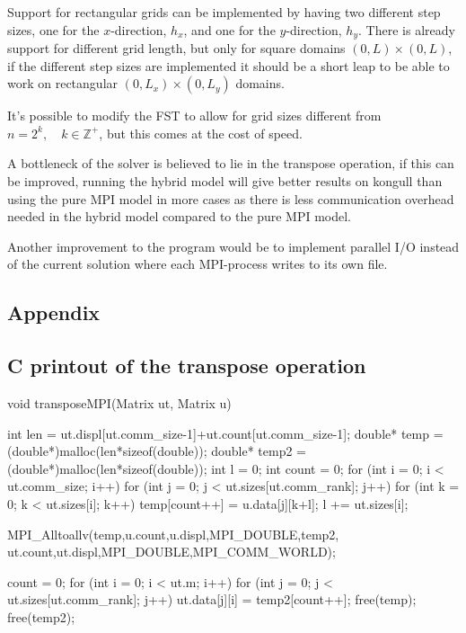 \documentclass[11pt,a4paper,english]{article}
\numberwithin{figure}{subsection}
\numberwithin{table}{subsection}
\begin{document}
Support for rectangular grids can be implemented by having two different step sizes, one for the $x$-direction, $h_x$, and one for the $y$-direction, $h_y$. There is already support for different grid length, but only for square domains $(0,L)\times(0,L)$, if the different step sizes are implemented it should be a short leap to be able to work on rectangular $(0,L_x)\times(0,L_y)$ domains.

It's possible to modify the FST to allow for grid sizes different from $n=2^k,\quad k\in\mathbb{Z}^+$, but this comes at the cost of speed.

A bottleneck of the solver is believed to lie in the transpose operation, if this can be improved, running the hybrid model will give better results on kongull than using the pure MPI model in more cases as there is less communication overhead needed in the hybrid model compared to the pure MPI model.

Another improvement to the program would be to implement parallel I/O instead of the current solution where each MPI-process writes to its own file.

\nocite{lecturenotes}
\newpage



\begin{appendix}
\section{Appendix}
\subsection{C printout of the transpose operation}
\begin{ccode}
void transposeMPI(Matrix ut, Matrix u){
	int len = ut.displ[ut.comm_size-1]+ut.count[ut.comm_size-1];
	double* temp = (double*)malloc(len*sizeof(double));
	double* temp2 = (double*)malloc(len*sizeof(double));
	int l = 0;
	int count = 0;
	for (int i = 0; i < ut.comm_size; i++){
		for (int j = 0; j < ut.sizes[ut.comm_rank]; j++){
			for (int k = 0; k < ut.sizes[i]; k++){
				temp[count++] = u.data[j][k+l];
			}
		}
		l += ut.sizes[i];
	}

	MPI_Alltoallv(temp,u.count,u.displ,MPI_DOUBLE,temp2,
	ut.count,ut.displ,MPI_DOUBLE,MPI_COMM_WORLD);
	
	count = 0;
	for (int i = 0; i < ut.m; i++){
		for (int j = 0; j < ut.sizes[ut.comm_rank]; j++){
			ut.data[j][i] = temp2[count++];
		}
	}
	free(temp);
	free(temp2);
}
\end{ccode}

\end{appendix}
\end{document}
